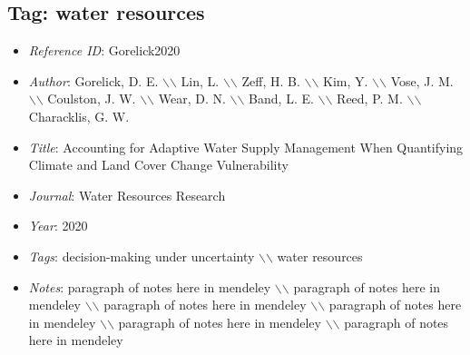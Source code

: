 \documentclass[11pt]{article}
\begin{document}
\subsection{Tag: water resources} 
\noindent\citep{Gorelick2020} 
\begin{itemize} 
\item{\textit{Reference ID}:  Gorelick2020} 

\item{\textit{Author}:  Gorelick, D. E. $\backslash$$\backslash$ Lin, L. $\backslash$$\backslash$ Zeff, H. B. $\backslash$$\backslash$ Kim, Y. $\backslash$$\backslash$ Vose, J. M. $\backslash$$\backslash$ Coulston, J. W. $\backslash$$\backslash$ Wear, D. N. $\backslash$$\backslash$ Band, L. E. $\backslash$$\backslash$ Reed, P. M. $\backslash$$\backslash$ Characklis, G. W.} 

\item{\textit{Title}:  Accounting for Adaptive Water Supply Management When Quantifying Climate and Land Cover Change Vulnerability} 

\item{\textit{Journal}:  Water Resources Research} 

\item{\textit{Year}:  2020} 

\item{\textit{Tags}:  decision-making under uncertainty $\backslash$$\backslash$ water resources} 

\item{\textit{Notes}:  paragraph of notes here in mendeley $\backslash$$\backslash$ paragraph of notes here in mendeley $\backslash$$\backslash$ paragraph of notes here in mendeley $\backslash$$\backslash$ paragraph of notes here in mendeley $\backslash$$\backslash$ paragraph of notes here in mendeley $\backslash$$\backslash$ paragraph of notes here in mendeley} 

\end{itemize}\medskip
\end{document}
